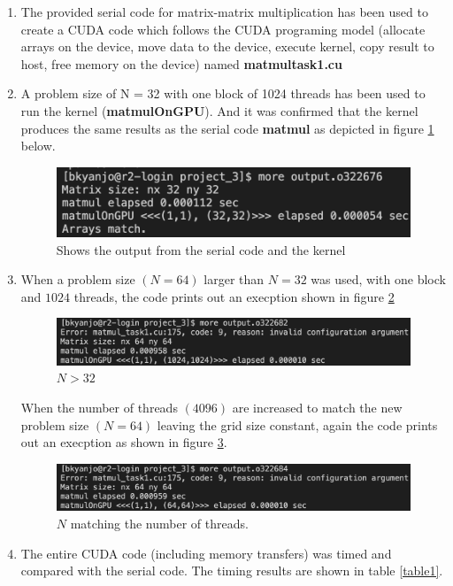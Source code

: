 \documentclass[12pt,a4paper]{article}
\begin{document}
\begin{enumerate}
	\item The provided serial code for matrix-matrix multiplication has been used to create a CUDA code which follows the CUDA programing model (allocate arrays on the device, move data to the device, execute kernel, copy result to host, free memory on the device) named\textbf{ matmul\textunderscore task1.cu}
	
	\item A problem size  of N = 32 with one block of 1024 threads has been used to run the kernel (\textbf{matmulOnGPU}). And it was confirmed that the kernel produces the same results as the serial code  \textbf{matmul} as depicted in figure \ref{fig:t12}  below. 
	
		\begin{figure}[h]
		\centering
		\includegraphics[width=0.5\linewidth]{"t12"}
		\caption{Shows the output from the serial code and the kernel}
		\label{fig:t12}
	\end{figure}

	\item When a problem size $(N = 64)$ larger than $N = 32$ was used, with one block and $1024$ threads, the code prints out an execption shown in figure \ref{fig:N>32}
	
		\begin{figure}[h]
		\centering
		\includegraphics[width=0.5\linewidth]{"N>32"}
		\caption{$N > 32$}
		\label{fig:N>32}
	\end{figure}
\noindent When  the number of threads $(4096)$ are increased to match the new problem size  $(N = 64)$
leaving the grid size constant, again the code prints out an execption as shown in figure \ref{fig:iN}.

\begin{figure}[h]
	\centering
	\includegraphics[width=0.5\linewidth]{"iN"}
	\caption{$N$ matching the number of threads.}
	\label{fig:iN}
\end{figure}
	
\item The entire CUDA code (including memory transfers) was timed and compared with the serial code. The timing results  are shown in table \ref{table1}.  


\end{enumerate}
\end{document}
